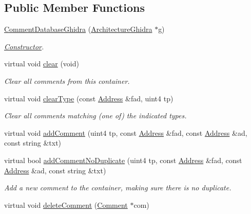 \subsection*{Public Member Functions}
\begin{DoxyCompactItemize}
\item 
\mbox{\hyperlink{class_comment_database_ghidra_a82d38a9bf0a21a74bb3327c0782e50f4}{Comment\+Database\+Ghidra}} (\mbox{\hyperlink{class_architecture_ghidra}{Architecture\+Ghidra}} $\ast$g)
\begin{DoxyCompactList}\small\item\em \mbox{\hyperlink{class_constructor}{Constructor}}. \end{DoxyCompactList}\item 
virtual void \mbox{\hyperlink{class_comment_database_ghidra_a723dd4415e6eab6c4b5edacbc97a9332}{clear}} (void)
\begin{DoxyCompactList}\small\item\em Clear all comments from this container. \end{DoxyCompactList}\item 
virtual void \mbox{\hyperlink{class_comment_database_ghidra_ac5b963863187535cd0c2150bc7df4510}{clear\+Type}} (const \mbox{\hyperlink{class_address}{Address}} \&fad, uint4 tp)
\begin{DoxyCompactList}\small\item\em Clear all comments matching (one of) the indicated types. \end{DoxyCompactList}\item 
virtual void \mbox{\hyperlink{class_comment_database_ghidra_ac4391823aa263f7c1b3488a825a534a9}{add\+Comment}} (uint4 tp, const \mbox{\hyperlink{class_address}{Address}} \&fad, const \mbox{\hyperlink{class_address}{Address}} \&ad, const string \&txt)
\item 
virtual bool \mbox{\hyperlink{class_comment_database_ghidra_a39ad32e0b6abb1ee32c96780ac9b446c}{add\+Comment\+No\+Duplicate}} (uint4 tp, const \mbox{\hyperlink{class_address}{Address}} \&fad, const \mbox{\hyperlink{class_address}{Address}} \&ad, const string \&txt)
\begin{DoxyCompactList}\small\item\em Add a new comment to the container, making sure there is no duplicate. \end{DoxyCompactList}\item 
virtual void \mbox{\hyperlink{class_comment_database_ghidra_a988787294b6b5657f7b895d0f8ecce92}{delete\+Comment}} (\mbox{\hyperlink{class_comment}{Comment}} $\ast$com)

\end{DoxyCompactItemize}
